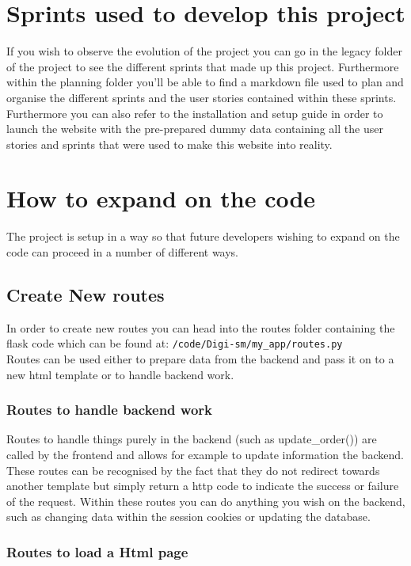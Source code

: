 \documentclass{article}
\begin{document}
\newpage

\section{Sprints used to develop this project}

If you wish to observe the evolution of the project you can go in the legacy folder of the project to see the different sprints that made up this project.
Furthermore within the planning folder you'll be able to find a markdown file used to plan and organise the different sprints and the user stories contained within these sprints.
Furthermore you can also refer to the installation and setup guide in order to launch the website with the pre-prepared dummy data containing all the user stories and sprints that were used to make this website into reality.

\section{How to expand on the code}

The project is setup in a way so that future developers wishing to expand on the code can proceed in a number of different ways.

\subsection{Create New routes}
In order to create new routes you can head into the routes folder containing the flask code which can be found at:
\verb|/code/Digi-sm/my_app/routes.py|\\
Routes can be used either to prepare data from the backend and pass it on to a new html template or to handle backend work.

\subsubsection{Routes to handle backend work}
Routes to handle things purely in the backend (such as update\_order()) are called by the frontend 
and allows for example to update information the backend. These routes can be recognised by the 
fact that they do not redirect towards another template but simply return a http code to indicate 
the success or failure of the request.
Within these routes you can do anything you wish on the backend, such as changing data within the session cookies or updating the database.

\subsubsection{Routes to load a Html page}
\end{document}
